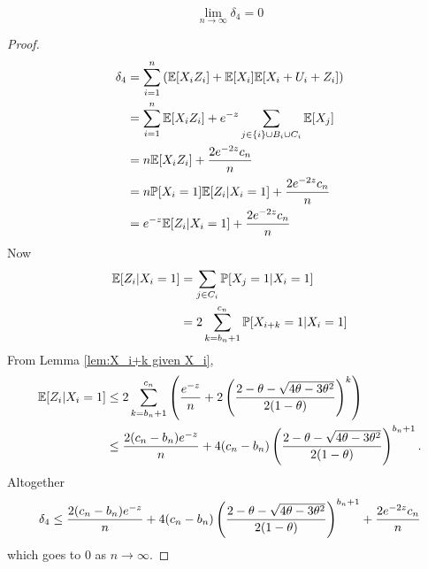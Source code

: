 	\begin{lemma}
	\label{lem:delta4 goes to 0}
		\begin{equation}
			\lim_{n\rightarrow\infty} \delta_4 = 0
		\end{equation}
	\end{lemma}
	\begin{proof}
		\begin{align}
			\delta_4 &= \sum_{i = 1}^n \left(\mathbb{E}[X_i Z_i] + \mathbb{E}[X_i]\mathbb{E}[X_i + U_i + Z_i]\right)\\
				&= \sum_{i=1}^n \mathbb{E}[X_i Z_i] + e^{-z} \sum_{j \in \{i\}\cup B_i \cup C_i} \mathbb{E}[X_j]\\
				&= n \mathbb{E}[X_i Z_i] + \frac{2e^{-2z}c_n}{n}\\
				&= n \mathbb{P}[X_i = 1] \mathbb{E}[Z_i | X_i = 1] + \frac{2e^{-2z}c_n}{n}\\
				&= e^{-z}\mathbb{E}[Z_i | X_i = 1] + \frac{2e^{-2z}c_n}{n}
		\end{align}
		Now
		\begin{align}
			\mathbb{E}[Z_i | X_i = 1] &= \sum_{j \in C_i} \mathbb{P}[X_j = 1 | X_i = 1]\\
			&= 2 \sum_{k = b_n + 1}^{c_n} \mathbb{P}[X_{i+k} = 1 | X_i = 1]
		\end{align}
		From Lemma \ref{lem:X_i+k given X_i},
		\begin{align}
			\mathbb{E}[Z_i | X_i = 1] &\leq 2 \sum_{k = b_n + 1}^{c_n} \left(\frac{e^{-z}}{n} + 2\left(\frac{2 - \theta - \sqrt{4\theta - 3\theta^2}}{2(1 - \theta)}\right)^k\right)\\
				&\leq \frac{2(c_n - b_n)e^{-z}}{n} + 4(c_n - b_n)\left(\frac{2 - \theta - \sqrt{4\theta - 3\theta^2}}{2(1 - \theta)}\right)^{b_n + 1}.
		\end{align}
		Altogether
		\begin{equation}
			\delta_4 \leq \frac{2(c_n - b_n)e^{-z}}{n} + 4(c_n - b_n)\left(\frac{2 - \theta - \sqrt{4\theta - 3\theta^2}}{2(1 - \theta)}\right)^{b_n + 1} + \frac{2e^{-2z}c_n}{n}
		\end{equation}
		which goes to $0$ as $n \rightarrow \infty$.
	\end{proof}

